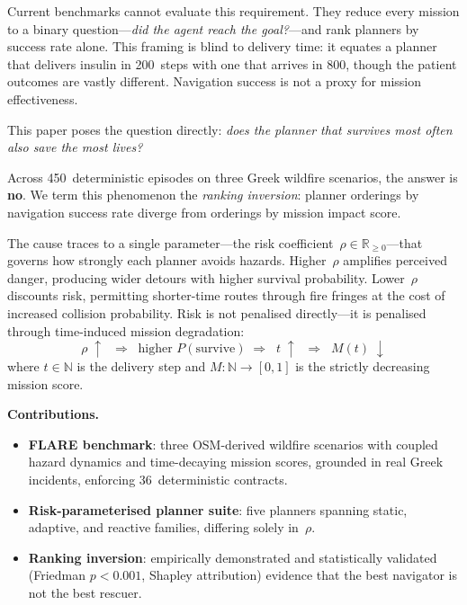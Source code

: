 \documentclass[conference]{IEEEtran}
\begin{document}
Current benchmarks cannot evaluate this requirement. They reduce every
mission to a binary question---\emph{did the agent reach the goal?}---and
rank planners by success rate alone. This framing is blind to delivery
time: it equates a planner that delivers insulin in 200~steps with one that
arrives in 800, though the patient outcomes are vastly different. Navigation
success is not a proxy for mission effectiveness.

This paper poses the question directly: \emph{does the planner that
survives most often also save the most lives?}

Across 450~deterministic episodes on three Greek wildfire scenarios, the
answer is \textbf{no}. We term this phenomenon the \emph{ranking
inversion}: planner orderings by navigation success rate diverge from
orderings by mission impact score.

The cause traces to a single parameter---the risk
coefficient~$\rho \in \mathbb{R}_{\geq 0}$---that governs how strongly
each planner avoids hazards. Higher~$\rho$ amplifies perceived danger,
producing wider detours with higher survival probability.
Lower~$\rho$ discounts risk, permitting shorter-time routes through fire
fringes at the cost of increased collision probability. Risk is not penalised
directly---it is penalised through time-induced mission degradation:
\begin{equation*}
  \rho \;\uparrow\;\; \Rightarrow \;\;
  \text{higher } P(\text{survive}) \;\Rightarrow\;\;
  t \;\uparrow\;\; \Rightarrow \;\;
  M(t) \;\downarrow
\end{equation*}
where $t \in \mathbb{N}$ is the delivery step and $M: \mathbb{N} \to [0,1]$
is the strictly decreasing mission score.

\textbf{Contributions.}
\begin{itemize}
  \item \textbf{FLARE benchmark}: three OSM-derived wildfire scenarios with
    coupled hazard dynamics and time-decaying mission scores, grounded in
    real Greek incidents, enforcing 36~deterministic contracts.
  \item \textbf{Risk-parameterised planner suite}: five planners spanning
    static, adaptive, and reactive families, differing solely in~$\rho$.
  \item \textbf{Ranking inversion}: empirically demonstrated and
    statistically validated (Friedman $p < 0.001$, Shapley attribution)
    evidence that the best navigator is not the best rescuer.
\end{itemize}
\end{document}
